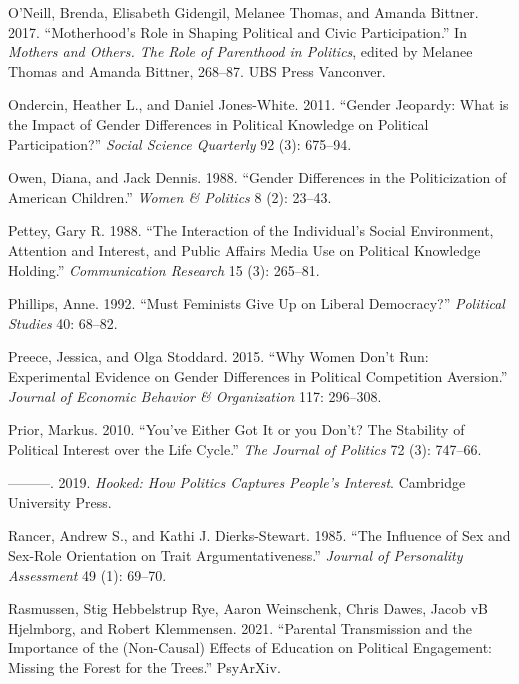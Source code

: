 \documentclass[
  letterpaper,
  DIV=11,
  numbers=noendperiod]{scrreprt}
\newlength{\cslhangindent}
\newlength{\cslentryspacingunit} %
\newenvironment{CSLReferences}[2] %
 {%
  \setlength{\parindent}{0pt}
  \ifodd #1
  \let\oldpar\par
  \def\par{\hangindent=\cslhangindent\oldpar}
  \fi
  \setlength{\parskip}{#2\cslentryspacingunit}
 }%
 {}
\begin{document}
\begin{CSLReferences}{1}{0}
\leavevmode{}%
O'Neill, Brenda, Elisabeth Gidengil, Melanee Thomas, and Amanda Bittner.
2017. {``{Motherhood's Role in Shaping Political and Civic
Participation}.''} In \emph{{Mothers and Others. The Role of Parenthood
in Politics}}, edited by Melanee Thomas and Amanda Bittner, 268--87. UBS
Press Vanconver.

\leavevmode{}%
Ondercin, Heather L., and Daniel Jones-White. 2011. {``{Gender Jeopardy:
What is the Impact of Gender Differences in Political Knowledge on
Political Participation?}''} \emph{Social Science Quarterly} 92 (3):
675--94.

\leavevmode{}%
Owen, Diana, and Jack Dennis. 1988. {``{Gender Differences in the
Politicization of American Children}.''} \emph{Women \& Politics} 8 (2):
23--43.

\leavevmode{}%
Pettey, Gary R. 1988. {``{The Interaction of the Individual's Social
Environment, Attention and Interest, and Public Affairs Media Use on
Political Knowledge Holding}.''} \emph{Communication Research} 15 (3):
265--81.

\leavevmode{}%
Phillips, Anne. 1992. {``{Must Feminists Give Up on Liberal
Democracy?}''} \emph{Political Studies} 40: 68--82.

\leavevmode{}%
Preece, Jessica, and Olga Stoddard. 2015. {``{Why Women Don't Run:
Experimental Evidence on Gender Differences in Political Competition
Aversion}.''} \emph{Journal of Economic Behavior \& Organization} 117:
296--308.

\leavevmode{}%
Prior, Markus. 2010. {``{You've Either Got It or you Don't? The
Stability of Political Interest over the Life Cycle}.''} \emph{The
Journal of Politics} 72 (3): 747--66.

\leavevmode{}%
---------. 2019. \emph{{Hooked: How Politics Captures People's
Interest}}. Cambridge University Press.

\leavevmode{}%
Rancer, Andrew S., and Kathi J. Dierks-Stewart. 1985. {``{The Influence
of Sex and Sex-Role Orientation on Trait Argumentativeness}.''}
\emph{Journal of Personality Assessment} 49 (1): 69--70.

\leavevmode{}%
Rasmussen, Stig Hebbelstrup Rye, Aaron Weinschenk, Chris Dawes, Jacob vB
Hjelmborg, and Robert Klemmensen. 2021. {``{Parental Transmission and
the Importance of the (Non-Causal) Effects of Education on Political
Engagement: Missing the Forest for the Trees}.''} PsyArXiv.


\end{CSLReferences}
\end{document}
